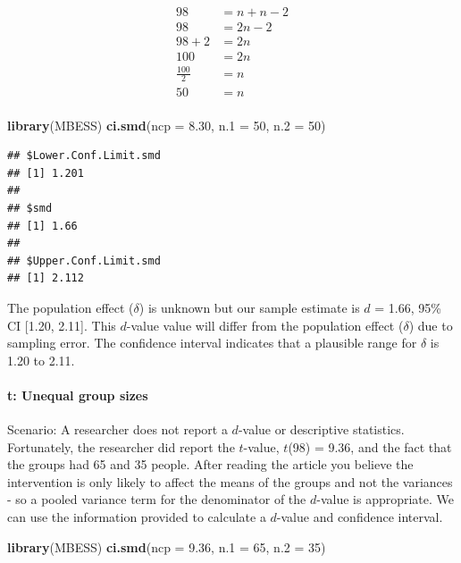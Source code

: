 \documentclass[
]{krantz}
\makeatletter
\newenvironment{Shaded}{\begin{snugshade}}{\end{snugshade}}
\newcommand{\DataTypeTok}[1]{\textcolor[rgb]{0.27,0.27,0.27}{#1}}
\newcommand{\DecValTok}[1]{\textcolor[rgb]{0.06,0.06,0.06}{#1}}
\newcommand{\FloatTok}[1]{\textcolor[rgb]{0.06,0.06,0.06}{#1}}
\newcommand{\KeywordTok}[1]{\textcolor[rgb]{0.27,0.27,0.27}{\textbf{#1}}}
\newcommand{\NormalTok}[1]{#1}
\newenvironment{kframe}{%
\medskip{}
\setlength{\fboxsep}{.8em}
 \def\at@end@of@kframe{}%
 \ifinner\ifhmode%
  \def\at@end@of@kframe{\end{minipage}}%
  \begin{minipage}{\columnwidth}%
 \fi\fi%
 \def\FrameCommand##1{\hskip\@totalleftmargin \hskip-\fboxsep
 \colorbox{shadecolor}{##1}\hskip-\fboxsep
     \hskip-\linewidth \hskip-\@totalleftmargin \hskip\columnwidth}%
 \MakeFramed {\advance\hsize-\width
   \@totalleftmargin\z@ \linewidth\hsize
   \@setminipage}}%
 {\par\unskip\endMakeFramed%
 \at@end@of@kframe}
\renewenvironment{Shaded}{\begin{kframe}}{\end{kframe}}
\makeatother
\begin{document}
\[
\begin{aligned}
98 &= n + n - 2\\
98 &= 2n - 2\\
98 + 2 &= 2n \\
100 &= 2n \\
\frac{100}{2} &= n \\
50 &= n \\
\end{aligned}
\]

\begin{Shaded}
\begin{Highlighting}[]
\KeywordTok{library}\NormalTok{(MBESS)}
\KeywordTok{ci.smd}\NormalTok{(}\DataTypeTok{ncp =} \FloatTok{8.30}\NormalTok{, }\DataTypeTok{n.1 =} \DecValTok{50}\NormalTok{, }\DataTypeTok{n.2 =} \DecValTok{50}\NormalTok{) }
\end{Highlighting}
\end{Shaded}

\begin{verbatim}
## $Lower.Conf.Limit.smd
## [1] 1.201
## 
## $smd
## [1] 1.66
## 
## $Upper.Conf.Limit.smd
## [1] 2.112
\end{verbatim}

The population effect (\(\delta\)) is unknown but our sample estimate is \(d\) = 1.66, 95\% CI {[}1.20, 2.11{]}. This \(d\)-value value will differ from the population effect (\(\delta\)) due to sampling error. The confidence interval indicates that a plausible range for \(\delta\) is 1.20 to 2.11.

\hypertarget{t-unequal-group-sizes}{%
\paragraph{t: Unequal group sizes}\label{t-unequal-group-sizes}}

Scenario: A researcher does not report a \(d\)-value or descriptive statistics. Fortunately, the researcher did report the \(t\)-value, \(t\)(98) = 9.36, and the fact that the groups had 65 and 35 people. After reading the article you believe the intervention is only likely to affect the means of the groups and not the variances - so a pooled variance term for the denominator of the \(d\)-value is appropriate. We can use the information provided to calculate a \(d\)-value and confidence interval.

\begin{Shaded}
\begin{Highlighting}[]
\KeywordTok{library}\NormalTok{(MBESS)}
\KeywordTok{ci.smd}\NormalTok{(}\DataTypeTok{ncp =} \FloatTok{9.36}\NormalTok{, }\DataTypeTok{n.1 =} \DecValTok{65}\NormalTok{, }\DataTypeTok{n.2 =} \DecValTok{35}\NormalTok{) }
\end{Highlighting}
\end{Shaded}
\end{document}
